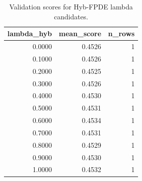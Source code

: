 \begin{table}[t]
\caption{Validation scores for Hyb-FPDE lambda candidates.}
\label{tab:lambda_distribution_computed}
\centering
\begin{tabular}{rrr}
\toprule
lambda\_hyb & mean\_score & n\_rows \\
\midrule
0.0000 & 0.4526 & 1 \\
0.1000 & 0.4526 & 1 \\
0.2000 & 0.4525 & 1 \\
0.3000 & 0.4526 & 1 \\
0.4000 & 0.4530 & 1 \\
0.5000 & 0.4531 & 1 \\
0.6000 & 0.4534 & 1 \\
0.7000 & 0.4531 & 1 \\
0.8000 & 0.4529 & 1 \\
0.9000 & 0.4530 & 1 \\
1.0000 & 0.4532 & 1 \\
\bottomrule
\end{tabular}

\end{table}
